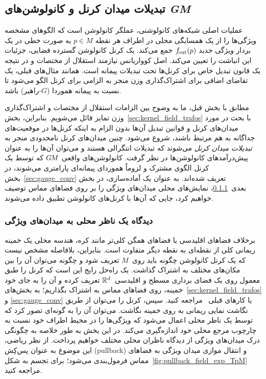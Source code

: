 

\subsection{تبدیلات میدان کرنل و کانولوشن‌های \textit{GM}}
\label{sec:gauge_conv_main}


عملیات اصلی شبکه‌های کانولوشنی، عملگر کانولوشن است که الگوهای مشخصه ویژگی‌ها را از یک همسایگی محلی در اطراف هر نقطه $p\in M$ به صورت خطی در یک بردار ویژگی جدید $f_\textup{\:\!\!out}(p)$ جمع می‌کند.
یک کرنل کانولوشن گسترده فضایی، جزئیات این انباشت را تعیین می‌کند.
اصل کوواریانس نیازمند استقلال از مختصات و در نتیجه یک قانون تبدیل خاص برای کرنل‌ها تحت تبدیلات پیمانه است.
همانند مثال‌های قبلی، یک تقاضای اضافی برای اشتراک‌گذاری وزن منجر به الزامی برای کرنل الگو می‌شود تا نسبت به پیمانه هموردا ($G$-راهبر) باشد.

مطابق با بخش قبل، ما به وضوح بین الزامات استقلال از مختصات و اشتراک‌گذاری وزن تمایز قائل می‌شویم.
بنابراین، بخش~\ref{sec:kernel_field_trafos} با بحث در مورد میدان‌های کرنل و قوانین تبدیل آن‌ها بدون الزام به اینکه کرنل‌ها در موقعیت‌های جداگانه به هم مرتبط باشند، شروع می‌شود.
چنین میدان‌های کرنل نامحدودی منجر به \emph{تبدیلات میدان کرنل} می‌شوند که تبدیلات انتگرالی هستند و می‌توان آن‌ها را به عنوان پیش‌درآمدهای کانولوشن‌ها در نظر گرفت.
کانولوشن‌های واقعی $G\mkern-1.4muM$ که توسط یک کرنل الگوی مشترک و لزوماً هموردای پیمانه‌ای پارامتری می‌شوند، در بخش~\ref{sec:gauge_conv} تعریف شده‌اند.
به عنوان یک آماده‌سازی، در بخش بعدی~\ref{sec:observers_view}، نمایش‌های محلی میدان‌های ویژگی را بر روی فضاهای مماس توصیف خواهیم کرد، جایی که آن‌ها با کرنل‌های کانولوشن تطبیق داده می‌شوند.







\subsubsection{دیدگاه یک ناظر محلی به میدان‌های ویژگی}
\label{sec:observers_view}

برخلاف فضاهای اقلیدسی یا فضاهای همگن کلی‌تر مانند کره، هندسه محلی یک خمینه ریمانی کلی از نقطه‌ای به نقطه دیگر متفاوت است.
بنابراین، بلافاصله مشخص نیست که یک کرنل کانولوشن چگونه باید روی~$M$ تعریف شود و چگونه می‌توان آن را بین مکان‌های مختلف به اشتراک گذاشت.
یک راه‌حل رایج این است که کرنل را طبق معمول روی یک فضای برداری مسطح و اقلیدسی~$\mathbb{R}^d$ تعریف کرده و آن را به جای خود خمینه، روی فضاهای مماس به اشتراک بگذاریم؛
به بخش‌های~\ref{sec:kernel_field_trafos} و \ref{sec:gauge_conv} یا کارهای قبلی~%
\cite{masci2015geodesic,poulenard2018multi,sun2018zernet,coors2018spherenet,gaugeIco2019,Wiersma2020,deHaan2020meshCNNs,Yang2020parallelFrameCNN} مراجعه کنید.
سپس، کرنل را می‌توان از طریق نگاشت نمایی ریمانی به روی خمینه نگاشت.
می‌توان آن را به گونه‌ای تصور کرد که توسط یک ناظر محلی اعمال می‌شود که ویژگی‌ها را در محیط اطراف خود نسبت به چارچوب مرجع محلی خود اندازه‌گیری می‌کند.
در این بخش به طور خلاصه به چگونگی درک میدان‌های ویژگی از دیدگاه ناظران محلی مختلف خواهیم پرداخت.
از نظر ریاضی، این موضوع به عنوان پس‌کِش (pullback) و انتقال موازی میدان ویژگی به فضاهای مماس فرمول‌بندی می‌شود؛ برای تجسم به شکل~\ref{fig:pullback_field_exp_TpM} مراجعه کنید.


